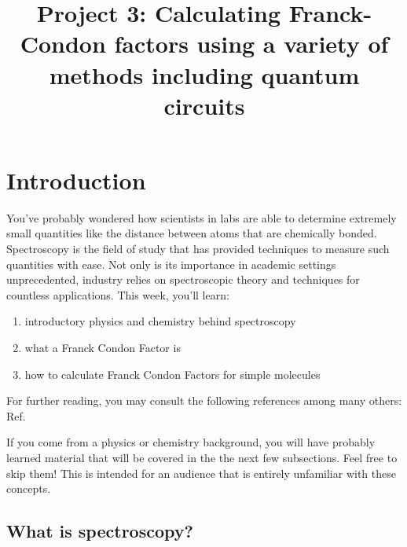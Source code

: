 \documentclass[12pt]{article}
\title{Project 3: Calculating Franck-Condon factors using a variety of methods including quantum circuits}
\begin{document}
\maketitle

\thispagestyle{empty}
\section{Introduction}

You've probably wondered how scientists in labs are able to determine extremely small quantities like the distance between atoms that are chemically bonded. 
Spectroscopy is the field of study that has provided techniques to measure such quantities with ease. Not only is its importance in academic settings unprecedented, industry relies on spectroscopic theory and techniques for countless applications. This week, you'll learn:

\begin{enumerate}
    \item introductory physics and chemistry behind spectroscopy
    \item what a Franck Condon Factor is
    \item how to calculate Franck Condon Factors for simple molecules
\end{enumerate}

For further reading, you may consult the following references among many others: Ref.~\cite{quesadaFranckCondonFactorsCounting2019,wrightFranckCondonFactorsTheir1999,fantzFranckCondonFactors2006}

If you come from a physics or chemistry background, you will have probably learned material that will be covered in the the next few subsections. Feel free to skip them! This is intended for an audience that is entirely unfamiliar with these concepts.

\subsection{What is spectroscopy?}
\end{document}
